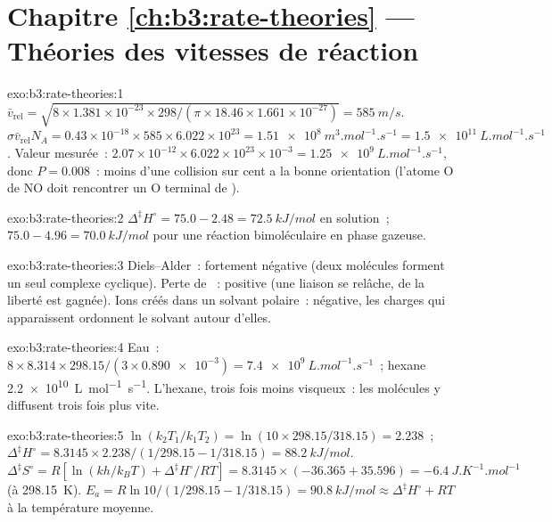 \section*{Chapitre \ref{ch:b3:rate-theories} --- Théories des vitesses de réaction}

\begin{solution}{exo:b3:rate-theories:1}
$\bar v_{\mathrm{rel}} = \sqrt{8 \times 1.381\times10^{-23} \times 298/(\pi \times 18.46 \times 1.661\times10^{-27})} = \qty{585}{m/s}$.
$\sigma\bar v_{\mathrm{rel}}N_A = 0.43\times10^{-18} \times 585 \times 6.022\times10^{23} = \qty{1.51e8}{m^3.mol^{-1}.s^{-1}} =
\qty{1.5e11}{L.mol^{-1}.s^{-1}}$. Valeur mesurée~: $2.07\times10^{-12} \times 6.022\times10^{23}\times10^{-3} =
\qty{1.25e9}{L.mol^{-1}.s^{-1}}$, donc $P = 0.008$~: moins d'une
collision sur cent a la bonne orientation (l'atome O de NO doit
rencontrer un O terminal de ).
\end{solution}

\begin{solution}{exo:b3:rate-theories:2}
$\Delta^{\ddagger}H^\circ = 75.0 - 2.48 = \qty{72.5}{kJ/mol}$ en solution~; $75.0 - 4.96 = \qty{70.0}{kJ/mol}$
pour une réaction bimoléculaire en phase gazeuse.
\end{solution}

\begin{solution}{exo:b3:rate-theories:3}
Diels--Alder~: fortement négative (deux molécules forment un seul
complexe cyclique). Perte de ~: positive (une liaison se relâche,
de la liberté est gagnée). Ions créés dans un solvant polaire~:
négative, les charges qui apparaissent ordonnent le solvant autour
d'elles.
\end{solution}

\begin{solution}{exo:b3:rate-theories:4}
Eau~: $8 \times 8.314 \times 298.15/(3 \times \num{0.890e-3}) = \qty{7.4e9}{L.mol^{-1}.s^{-1}}$~;
hexane
\qty{2.2e10}{L.mol^{-1}.s^{-1}}. L'hexane, trois fois moins visqueux~:
les molécules y diffusent trois fois plus vite.
\end{solution}

\begin{solution}{exo:b3:rate-theories:5}
$\ln(k_2T_1/k_1T_2) = \ln(10 \times 298.15/318.15) = 2.238$~; $\Delta^{\ddagger}H^\circ = 8.3145 \times 2.238/(1/298.15 -
1/318.15) = \qty{88.2}{kJ/mol}$. $\Delta^{\ddagger}S^\circ = R[\ln(kh/k_BT) + \Delta^{\ddagger}H^\circ/RT] = 8.3145 \times
(-36.365 + 35.596) = \qty{-6.4}{J.K^{-1}.mol^{-1}}$ (à \qty{298.15}{K}). $E_a = R\ln10/(1/298.15 - 1/318.15) =
\qty{90.8}{kJ/mol} \approx \Delta^{\ddagger}H^\circ + RT$ à la température
moyenne.
\end{solution}

